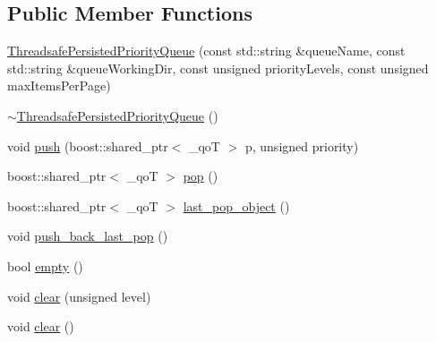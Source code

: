 \subsection*{Public Member Functions}
\begin{DoxyCompactItemize}
\item 
\hyperlink{classkisscpp_1_1_threadsafe_persisted_priority_queue_ad93da6323ca757793d77379d9dbf28a7}{Threadsafe\-Persisted\-Priority\-Queue} (const std\-::string \&queue\-Name, const std\-::string \&queue\-Working\-Dir, const unsigned priority\-Levels, const unsigned max\-Items\-Per\-Page)
\item 
\hyperlink{classkisscpp_1_1_threadsafe_persisted_priority_queue_a595ff6bfbc443d50b5f280711618fc9d}{$\sim$\-Threadsafe\-Persisted\-Priority\-Queue} ()
\item 
void \hyperlink{classkisscpp_1_1_threadsafe_persisted_priority_queue_a593f66f576c7d4502e44529efbfad7d0}{push} (boost\-::shared\-\_\-ptr$<$ \-\_\-qo\-T $>$ p, unsigned priority)
\item 
boost\-::shared\-\_\-ptr$<$ \-\_\-qo\-T $>$ \hyperlink{classkisscpp_1_1_threadsafe_persisted_priority_queue_a34be1a3216d514fdf5263a3b65eb3d87}{pop} ()
\item 
boost\-::shared\-\_\-ptr$<$ \-\_\-qo\-T $>$ \hyperlink{classkisscpp_1_1_threadsafe_persisted_priority_queue_aa0bd8c361a95ae5ed3e15621178a2d65}{last\-\_\-pop\-\_\-object} ()
\item 
void \hyperlink{classkisscpp_1_1_threadsafe_persisted_priority_queue_a43706bc9b32eb6b4f8a89242818d7e51}{push\-\_\-back\-\_\-last\-\_\-pop} ()
\item 
bool \hyperlink{classkisscpp_1_1_threadsafe_persisted_priority_queue_ab45f3294d86458e714364dec22a9980c}{empty} ()
\item 
void \hyperlink{classkisscpp_1_1_threadsafe_persisted_priority_queue_aafe0d24defdf58523c7e6532055569e5}{clear} (unsigned level)
\item 
void \hyperlink{classkisscpp_1_1_threadsafe_persisted_priority_queue_a17e86ea47a27497f4396f84e9ad1b314}{clear} ()
\end{DoxyCompactItemize}


